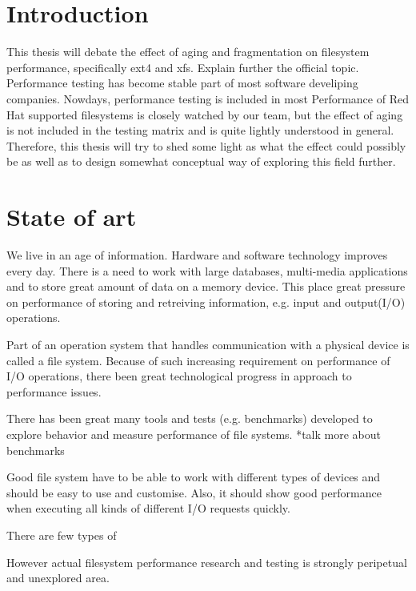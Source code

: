 \documentclass[
  color, %
  table, %
  lof,   %
  lot,   %
]{fithesis3}
\begin{document}
\chapter{Introduction}
This thesis will debate the effect of aging and fragmentation on filesystem performance, specifically ext4 and xfs.
Explain further the official topic.
Performance testing has become stable part of most software develiping companies.
Nowdays, performance testing is included in most 
Performance of Red Hat supported filesystems is closely watched by our team, but the effect of aging is not included in the testing matrix and is quite lightly understood in general.
Therefore, this thesis will try to shed some light as what the effect could possibly be as well as to design somewhat conceptual way of exploring this field further.




\chapter{State of art}
We live in an age of information. Hardware and software technology improves every day. There is a need to work with large databases, multi-media applications and to store great amount of data on a memory device. This place great pressure on performance of storing and retreiving information, e.g. input and output(I/O) operations.

Part of an operation system that handles communication with a physical device is called a file system. Because of such increasing requirement on performance of I/O operations, there been great technological progress in approach to performance issues. 

There has been great many tools and tests (e.g. benchmarks) developed to explore behavior and measure performance of file systems. *talk more about benchmarks

Good file system have to be able to work with different types of devices and should be easy to use and customise. Also, it should show good performance when executing all kinds of different I/O requests quickly.

There are few types of


However actual filesystem performance research and testing is strongly peripetual and unexplored area.
\end{document}
